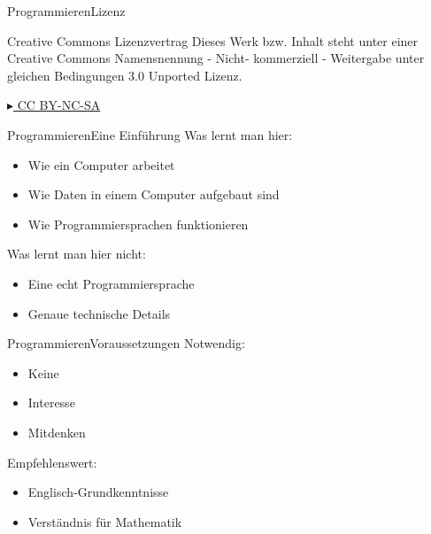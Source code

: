 


\begin{frame}{Programmieren}{Lizenz}

	\begin{block}{Creative Commons Lizenzvertrag}
     Dieses Werk bzw. Inhalt steht unter einer Creative Commons Namensnennung - Nicht-	kommerziell - Weitergabe unter gleichen Bedingungen 3.0 Unported Lizenz.
	\end{block}
	\begin{center}
	\href{http://creativecommons.org/licenses/by-nc-sa/3.0/deed.de}{$\blacktriangleright$ CC BY-NC-SA}
	\end{center}
\end{frame}


\begin{frame}{Programmieren}{Eine Einführung}
	Was lernt man hier:
	\begin{itemize}
	\item Wie ein Computer arbeitet
	\item Wie Daten in einem Computer aufgebaut sind
	\item Wie Programmiersprachen funktionieren
	\end{itemize}
	\vspace*{0.3cm}
	
	Was lernt man hier nicht:
	\begin{itemize}
	\item Eine echt Programmiersprache
	\item Genaue technische Details
	\end{itemize}
\end{frame}


\begin{frame}{Programmieren}{Voraussetzungen}
	Notwendig:
	\begin{itemize}
	\item Keine
	\item Interesse
	\item Mitdenken
	\end{itemize}
	\vspace*{0.3cm}
	
	Empfehlenswert:
	\begin{itemize}
	\item Englisch-Grundkenntnisse
	\item Verständnis für Mathematik
	\end{itemize}
\end{frame}

